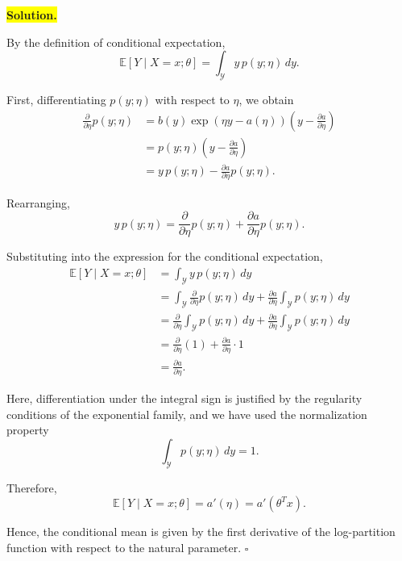 \documentclass[10pt]{article}
\begin{document}
\begin{enumerate}
\begin{enumerate}[label=(\alph*)]

\medskip
\noindent\colorbox{yellow}{\textbf{Solution.}}
\vspace{3mm}


By the definition of conditional expectation,
\[
\mathbb{E}[Y\mid X=x;\theta]
=
\int_{\mathcal Y} y\,p(y;\eta)\,dy.
\]

First, differentiating $p(y;\eta)$ with respect to $\eta$, we obtain
\[
\begin{aligned}
\frac{\partial}{\partial\eta}p(y;\eta)
&=
b(y)\exp\left(\eta y-a(\eta)\right)
\left(y-\frac{\partial a}{\partial\eta}\right)\\
&=
p(y;\eta)\left(y-\frac{\partial a}{\partial\eta}\right)\\
&=
y\,p(y;\eta)
-
\frac{\partial a}{\partial\eta}p(y;\eta).
\end{aligned}
\]

Rearranging,
\[
\boxed{
y\,p(y;\eta)
=
\frac{\partial}{\partial\eta}p(y;\eta)
+
\frac{\partial a}{\partial\eta}p(y;\eta).
}
\]

Substituting into the expression for the conditional expectation,
\[
\begin{aligned}
\mathbb{E}[Y\mid X=x;\theta]
&=
\int_{\mathcal Y} y\,p(y;\eta)\,dy\\[4pt]
&=
\int_{\mathcal Y}
\frac{\partial}{\partial\eta}p(y;\eta)\,dy
+
\frac{\partial a}{\partial\eta}
\int_{\mathcal Y}p(y;\eta)\,dy\\[4pt]
&=
\frac{\partial}{\partial\eta}
\int_{\mathcal Y}p(y;\eta)\,dy
+
\frac{\partial a}{\partial\eta}
\int_{\mathcal Y}p(y;\eta)\,dy\\[4pt]
&=
\frac{\partial}{\partial\eta}(1)
+
\frac{\partial a}{\partial\eta}\cdot 1\\[4pt]
&=
\frac{\partial a}{\partial\eta}.
\end{aligned}
\]

Here, differentiation under the integral sign is justified
by the regularity conditions of the exponential family,
and we have used the normalization property
\[
\int_{\mathcal Y}p(y;\eta)\,dy=1.
\]

Therefore,
\[
\boxed{
\mathbb{E}[Y\mid X=x;\theta]
=
a'(\eta)
=
a'(\theta^T x).
}
\]

Hence, the conditional mean is given by the first derivative
of the log-partition function with respect to the natural parameter.
\hfill $\square$



\end{enumerate}
\end{enumerate}
\end{document}
